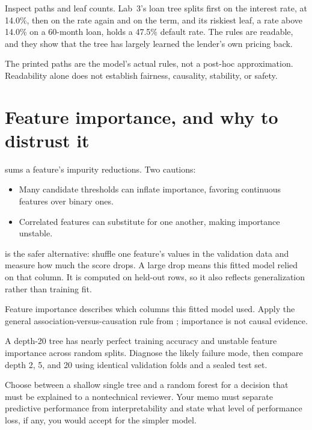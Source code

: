 Inspect paths and leaf counts. Lab~3's loan tree splits first on the interest rate, at 14.0\%, then on the rate again and on the term, and its riskiest leaf, a rate above 14.0\% on a 60-month loan, holds a 47.5\% default rate. The rules are readable, and they show that the tree has largely learned the lender's own pricing back.

\begin{keyidea}
The printed paths are the model's actual rules, not a post-hoc approximation. Readability alone does not establish fairness, causality, stability, or safety.
\end{keyidea}

\section{Feature importance, and why to distrust it}
\label{sec:tree-feature-importance}

 sums a feature's impurity reductions. Two cautions:

\begin{itemize}
  \item Many candidate thresholds can inflate importance, favoring continuous features over binary ones.
  \item Correlated features can substitute for one another, making importance unstable.
\end{itemize}

 is the safer alternative: shuffle one feature's values in the validation data and measure how much the score drops. A large drop means this fitted model relied on that column. It is computed on held-out rows, so it also reflects generalization rather than training fit.

\begin{keyidea}
Feature importance describes which columns this fitted model used. Apply the general association-versus-causation rule from ; importance is not causal evidence.
\end{keyidea}

\begin{debugtask}
A depth-20 tree has nearly perfect training accuracy and unstable feature importance across random splits. Diagnose the likely failure mode, then compare depth 2, 5, and 20 using identical validation folds and a sealed test set.
\end{debugtask}

\begin{decisionmemo}
Choose between a shallow single tree and a random forest for a decision that must be explained to a nontechnical reviewer. Your memo must separate predictive performance from interpretability and state what level of performance loss, if any, you would accept for the simpler model.
\end{decisionmemo}

